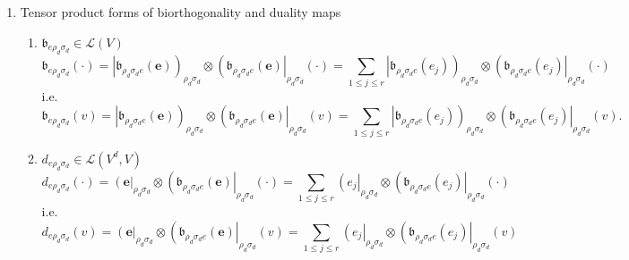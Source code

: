 \documentclass[aps,preprint]{revtex4}
\begin{document}
\begin{enumerate}
\item Tensor product forms of biorthogonality and duality maps

\begin{enumerate}
\item $\mathfrak{b}_{e\rho _{d}\sigma _{d}}\in \mathcal{L}\left( V\right) $%
\begin{equation}
\mathfrak{b}_{e\rho _{d}\sigma _{d}}\left( \cdot \right) =\left\vert 
\mathfrak{b}_{\rho _{d}\sigma _{d}e}\left( \boldsymbol{e}\right) \right)
_{\rho _{d}\sigma _{d}}\otimes \left( \mathfrak{b}_{\rho _{d}\sigma
_{d}e}\left( \boldsymbol{e}\right) \right\vert _{\rho _{d}\sigma _{d}}\left(
\cdot \right) =\sum_{1\leq j\leq r}\left\vert \mathfrak{b}_{\rho _{d}\sigma
_{d}e}\left( e_{j}\right) \right) _{\rho _{d}\sigma _{d}}\otimes \left( 
\mathfrak{b}_{\rho _{d}\sigma _{d}e}\left( e_{j}\right) \right\vert _{\rho
_{d}\sigma _{d}}\left( \cdot \right)
\end{equation}%
i.e. 
\begin{equation}
\mathfrak{b}_{e\rho _{d}\sigma _{d}}\left( v\right) =\left\vert \mathfrak{b}%
_{\rho _{d}\sigma _{d}e}\left( \boldsymbol{e}\right) \right) _{\rho
_{d}\sigma _{d}}\otimes \left( \mathfrak{b}_{\rho _{d}\sigma _{d}e}\left( 
\boldsymbol{e}\right) \right\vert _{\rho _{d}\sigma _{d}}\left( v\right)
=\sum_{1\leq j\leq r}\left\vert \mathfrak{b}_{\rho _{d}\sigma _{d}e}\left(
e_{j}\right) \right) _{\rho _{d}\sigma _{d}}\otimes \left( \mathfrak{b}%
_{\rho _{d}\sigma _{d}e}\left( e_{j}\right) \right\vert _{\rho _{d}\sigma
_{d}}\left( v\right) .
\end{equation}

\item $d_{e\rho _{d}\sigma _{d}}\in \mathcal{L}\left( V^{d},V\right) $%
\begin{equation}
d_{e\rho _{d}\sigma _{d}}\left( \cdot \right) =\left( \boldsymbol{e}%
\right\vert _{\rho _{d}\sigma _{d}}\otimes \left( \mathfrak{b}_{\rho
_{d}\sigma _{d}e}\left( \boldsymbol{e}\right) \right\vert _{\rho _{d}\sigma
_{d}}\left( \cdot \right) =\sum_{1\leq j\leq r}\left( e_{j}\right\vert
_{\rho _{d}\sigma _{d}}\otimes \left( \mathfrak{b}_{\rho _{d}\sigma
_{d}e}\left( e_{j}\right) \right\vert _{\rho _{d}\sigma _{d}}\left( \cdot
\right)
\end{equation}%
i.e. 
\begin{equation}
d_{e\rho _{d}\sigma _{d}}\left( v\right) =\left( \boldsymbol{e}\right\vert
_{\rho _{d}\sigma _{d}}\otimes \left( \mathfrak{b}_{\rho _{d}\sigma
_{d}e}\left( \boldsymbol{e}\right) \right\vert _{\rho _{d}\sigma _{d}}\left(
v\right) =\sum_{1\leq j\leq r}\left( e_{j}\right\vert _{\rho _{d}\sigma
_{d}}\otimes \left( \mathfrak{b}_{\rho _{d}\sigma _{d}e}\left( e_{j}\right)
\right\vert _{\rho _{d}\sigma _{d}}\left( v\right)
\end{equation}


\end{enumerate}
\end{enumerate}
\end{document}
